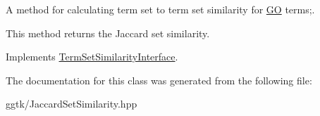 A method for calculating term set to term set similarity for \hyperlink{namespaceGO}{GO} terms;. 

This method returns the Jaccard set similarity. 

Implements \hyperlink{classTermSetSimilarityInterface_aeb985b714efc3df40e55bdd31e425e04}{Term\+Set\+Similarity\+Interface}.



The documentation for this class was generated from the following file\+:\begin{DoxyCompactItemize}
\item 
ggtk/Jaccard\+Set\+Similarity.\+hpp\end{DoxyCompactItemize}
